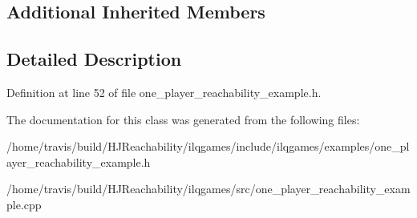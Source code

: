 \subsection*{Additional Inherited Members}


\subsection{Detailed Description}


Definition at line 52 of file one\+\_\+player\+\_\+reachability\+\_\+example.\+h.



The documentation for this class was generated from the following files\+:\begin{DoxyCompactItemize}
\item 
/home/travis/build/\+H\+J\+Reachability/ilqgames/include/ilqgames/examples/one\+\_\+player\+\_\+reachability\+\_\+example.\+h\item 
/home/travis/build/\+H\+J\+Reachability/ilqgames/src/one\+\_\+player\+\_\+reachability\+\_\+example.\+cpp\end{DoxyCompactItemize}
